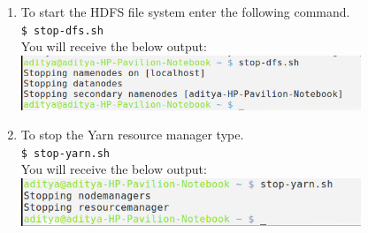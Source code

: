 \documentclass[12pt]{article}%
\begin{document}
\begin{enumerate}
\item To start the HDFS file system enter the following command.\\
\lstinline{$ stop-dfs.sh}\\
You will receive the below output:\\
\includegraphics[width=0.8\textwidth]{stopdfs.png}


\item To stop the Yarn resource manager type.\\
\lstinline{$ stop-yarn.sh}\\
You will receive the below output:\\
\includegraphics[width=0.8\textwidth]{stopyarn.png}

\end{enumerate}  
  
  
  
  
  
  
  
  
  
\end{document}
